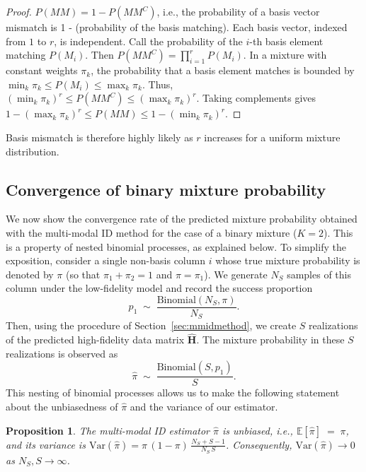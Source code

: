 \documentclass[preprint,10pt]{elsarticle}
\newtheorem{proposition}{Proposition}
\begin{document}
\begin{proof}
    $P(MM) = 1 - P(MM^C)$, i.e., the probability of a basis vector mismatch is 1 - (probability of the basis matching). Each basis vector, indexed from $1$ to $r$, is independent. Call the probability of the $i$-th basis element matching $P(M_i)$. Then $P(MM^C) = \prod_{i=1}^rP(M_i)$.
    In a mixture with constant weights $\pi_k$, the probability that a basis element matches is bounded by $\min_k \pi_k \leq P(M_i) \leq \max_k \pi_k$. Thus, $(\min_k \pi_k)^r \leq P(MM^C) \leq (\max_k \pi_k)^r$. Taking complements gives $1 - (\max_k \pi_k)^r \leq P(MM) \leq 1 - (\min_k \pi_k)^r$.
\end{proof}

Basis mismatch is therefore highly likely as $r$ increases for a uniform mixture distribution.








\subsection{Convergence of binary mixture probability}

We now show the convergence rate of the predicted mixture probability obtained with the multi-modal ID method for the case of a binary mixture ($K=2$). This is a property of nested binomial processes, as explained below.
To simplify the exposition, consider a single non-basis column $i$ whose true mixture probability is denoted by $\pi$ (so that $\pi_1 + \pi_2 = 1$ and $\pi = \pi_1$). We generate $N_S$ samples of this column under the low-fidelity model and record the success proportion 
\[
    p_1 \;\sim\; \frac{\mathrm{Binomial}(N_S, \pi)}{N_S}.
\]
Then, using the procedure of Section~\ref{sec:mmidmethod}, we create $S$ realizations of the predicted high-fidelity data matrix $\widehat{\bm{H}}$. The mixture probability in these $S$ realizations is observed as
\[
    \hat{\pi} \;\sim\; \frac{\mathrm{Binomial}(S, p_1)}{S}.
\]
This nesting of binomial processes allows us to make the following statement about the unbiasedness of $\hat{\pi}$ and the variance of our estimator.

\begin{proposition}

The multi-modal ID estimator $\hat{\pi}$ is unbiased, i.e., $\mathbb{E}[\hat{\pi}] \;=\; \pi$,
and its variance is $\mathrm{Var}(\hat{\pi}) = \pi\,(1-\pi)\,\frac{N_S + S - 1}{N_S\,S}$.
Consequently, $\mathrm{Var}(\hat{\pi}) \to 0$ as $N_S, S \to \infty$.
\end{proposition}
\end{document}
